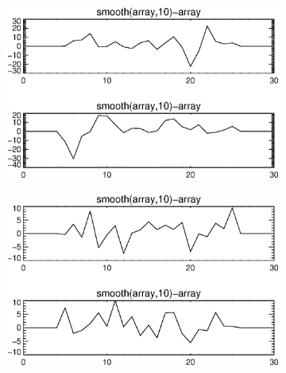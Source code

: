 \documentclass[10pt]{scrartcl}
\begin{document}
\begin{figure}[!ht]
\begin{subfigure}[b]{.3\linewidth}
    \end{subfigure}
\vspace{0.2in}

    \begin{subfigure}[b]{.3\linewidth}
        \centering
        \includegraphics[width=1.0\linewidth]{../plots_tables_images/1d1dsums_0_8.eps}
    \end{subfigure}
    \begin{subfigure}[b]{.3\linewidth}
        \centering
        \includegraphics[width=1.0\linewidth]{../plots_tables_images/1d1dsums_0_9.eps}
    \end{subfigure}
    \begin{subfigure}[b]{.3\linewidth}
        \centering

\end{subfigure}
\end{figure}
\end{document}
